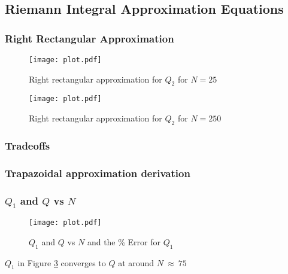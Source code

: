 \documentclass[12pt]{article}
\begin{document}
		\subsection{Riemann Integral Approximation Equations}
			\subsubsection{Right Rectangular Approximation}
				
				
				\begin{figure}[H]
					\centering
					\texttt{[image: plot.pdf]}
					\caption{\Large Right rectangular approximation for $Q_{2}$ for $N = 25$}
					\label{fig:q2barplot25}
				\end{figure}
			
				\begin{figure}[H]
					\centering
					\texttt{[image: plot.pdf]}
					\caption{\Large Right rectangular approximation for $Q_{2}$ for $N = 250$}
					\label{fig:q2barplot250}
				\end{figure}	
						
			\subsubsection{Tradeoffs}
			
			\subsubsection{Trapazoidal approximation derivation}
				
			\newpage
			\subsubsection{$Q_{1}$ and $Q$ vs $N$}
				
				
				
				\begin{figure}[H]
					\centering
					\texttt{[image: plot.pdf]}
					\caption{\Large $Q_{1}$ and $Q$ vs $N$ and the \% Error for $Q_{1}$}
					\label{fig:q1sumerrorplot}
				\end{figure}	
				 $Q_{1}$ in Figure \ref{fig:q1sumerrorplot} converges to $Q$ at around $N \ \approx \ 75$	
				 \newpage
\end{document}
